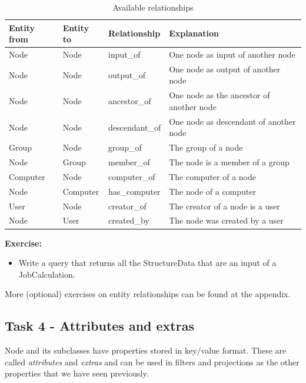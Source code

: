 \begin{table}
	\begin{center}
		\begin{tabular}{l l l l}
		Entity from	& Entity to	& Relationship & Explanation\\ \hline\hline
		Node & Node & input\_of & One node as input of another node\\
		Node & Node & output\_of & One node as output of another node\\
		Node & Node & ancestor\_of & One node as the ancestor of another node\\
		Node & Node & descendant\_of & One node as descendant of another node\\\hline
		Group & Node & group\_of & The group of a node\\
		Node & Group & member\_of & The node is a member of a group\\\hline
		Computer & Node & computer\_of & The computer of a node\\
		Node & Computer & has\_computer & The node of a computer\\\hline
		User & Node & creator\_of & The creator of a node is a user\\
		Node & User & created\_by & The node was created by a user\\
		\end{tabular}
		\caption{Available relationships}
		\label{table:join_rel}
		\end{center}
	\end{table}



\begin{tcolorbox}
\textbf{Exercise:}
\begin{itemize}
	\item Write a query that returns all the StructureData that are an input of a JobCalculation.
\end{itemize}
More (optional) exercises on entity relationships can be found at the appendix.
\end{tcolorbox}


\subsection*{Task 4 - Attributes and extras}
Node and its subclasses have properties stored in key/value format.
These are called \emph{attributes} and \emph{extras} and can be used in filters and projections as the other properties that we have seen previously.

